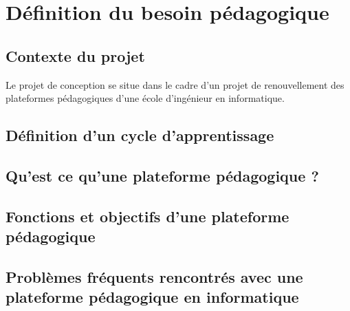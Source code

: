 \section{Définition du besoin pédagogique}

\subsection{Contexte du projet}

Le projet de conception se situe dans le cadre d'un projet de renouvellement des plateformes pédagogiques d'une école d'ingénieur en informatique.\\

\subsection{Définition d'un cycle d'apprentissage}

\subsection{Qu'est ce qu'une plateforme pédagogique ?}

\subsection{Fonctions et objectifs d'une plateforme pédagogique}

\subsection{Problèmes fréquents rencontrés avec une plateforme pédagogique en informatique}

